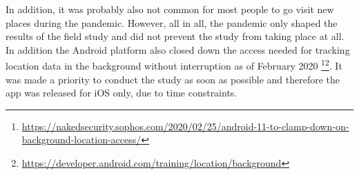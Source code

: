 In addition, it was probably also not common for most people to go visit new places during the pandemic. However, all in all, the pandemic only shaped the results of the field study and did not prevent the study from taking place at all. In addition the Android platform also closed down the access needed for tracking location data in the background without interruption as of February 2020 \footnote{\url{https://nakedsecurity.sophos.com/2020/02/25/android-11-to-clamp-down-on-background-location-access/}}\footnote{\url{https://developer.android.com/training/location/background}}. It was made a priority to conduct the study as soon as possible and therefore the app was released for iOS only, due to time constraints.


